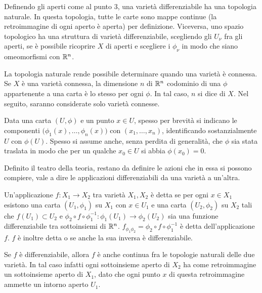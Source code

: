 \begin{remark}
  Definendo gli aperti come al punto $3$, una varietà differenziabile ha una topologia naturale. In questa topologia, tutte le carte sono mappe continue (la retroimmagine di ogni aperto è aperta) per definizione. Viceversa, uno spazio topologico ha una struttura di varietà differenziabile, scegliendo gli $U_{\nu}$ fra gli aperti, se è possibile ricoprire $X$ di aperti e scegliere i $\phi_{\nu}$ in modo che siano omeomorfismi con $\mathbb{R}^{n}$.
\end{remark}
\begin{remark}
  La topologia naturale rende possibile determinare quando una varietà è connessa. Se $X$ è una varietà connessa, la dimensione $n$ di $\mathbb{R}^{n}$ codominio di una $\phi$ appartenente a una carta è lo stesso per ogni $\phi$. In tal caso, $n$ si dice  di $X$. Nel seguito, saranno considerate solo varietà connesse.
\end{remark}

Data una carta $(U,\phi)$ e un punto $x \in U$, spesso per brevità si indicano le componenti $\big(\phi_1(x), \ldots, \phi_{n}(x)\big)$ con $(x_1, \ldots, x_n)$, identificando sostanzialmente $U$ con $\phi(U)$. Spesso si assume anche, senza perdita di generalità, che $\phi$ sia stata traslata in modo che per un qualche $x_0 \in  U$ si abbia $\phi(x_0) = 0$. 

Definito il teatro della teoria, restano da definire le azioni che in essa si possono compiere, vale a dire le applicazioni differenziabili da una varietà a un'altra.
\begin{definition}
  Un'applicazione $f:X_1 \to X_2$ tra varietà $X_1, X_2$ è detta  se per ogni $x \in  X_1$ esistono una carta $(U_1, \phi_1)$ su $X_1$ con $x \in U_1$ e una carta $(U_2, \phi_2)$ su $X_2$ tali che $f(U_1) \subset U_2$ e $\phi_2 \circ f \circ \phi_1^{-1}: \phi_1(U_1) \to \phi_2(U_2)$ sia una funzione differenziabile tra sottoinsiemi di $\mathbb{R}^{n}$. $f_{\phi_1 \phi_2} = \phi_2 \circ f \circ \phi_1^{-1}$ è detta  dell'applicazione $f$. $f$ è inoltre detta  o  se anche la sua inversa è differenziabile.
\end{definition}
\begin{remark}
  Se $f$ è differenziabile, allora $f$ è anche continua fra le topologie naturali delle due varietà. In tal caso infatti ogni sottoinsieme aperto di $X_2$ ha come retroimmagine un sottoinsieme aperto di $X_1$, dato che ogni punto $x$ di questa retroimmagine ammette un intorno aperto $U_1$.
\end{remark}

